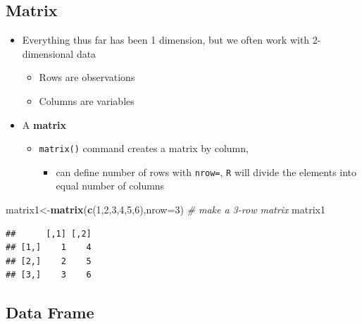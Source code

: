 \documentclass[]{book}
\newenvironment{Shaded}{\begin{snugshade}}{\end{snugshade}}
\newcommand{\KeywordTok}[1]{\textcolor[rgb]{0.13,0.29,0.53}{\textbf{#1}}}
\newcommand{\DataTypeTok}[1]{\textcolor[rgb]{0.13,0.29,0.53}{#1}}
\newcommand{\DecValTok}[1]{\textcolor[rgb]{0.00,0.00,0.81}{#1}}
\newcommand{\CommentTok}[1]{\textcolor[rgb]{0.56,0.35,0.01}{\textit{#1}}}
\newcommand{\NormalTok}[1]{#1}
\providecommand{\tightlist}{%
  \setlength{\itemsep}{0pt}\setlength{\parskip}{0pt}}
\theoremstyle{definition}
\theoremstyle{definition}
\theoremstyle{definition}
\theoremstyle{remark}
\begin{document}
\subsection{Matrix}\label{matrix}

\begin{itemize}
\tightlist
\item
  Everything thus far has been 1 dimension, but we often work with
  2-dimensional data

  \begin{itemize}
  \tightlist
  \item
    Rows are observations
  \item
    Columns are variables
  \end{itemize}
\item
  A \textbf{matrix}

  \begin{itemize}
  \tightlist
  \item
    \texttt{matrix()} command creates a matrix by column,

    \begin{itemize}
    \tightlist
    \item
      can define number of rows with \texttt{nrow=}, \texttt{R} will
      divide the elements into equal number of columns
    \end{itemize}
  \end{itemize}
\end{itemize}

\begin{Shaded}
\begin{Highlighting}[]
\NormalTok{matrix1<-}\KeywordTok{matrix}\NormalTok{(}\KeywordTok{c}\NormalTok{(}\DecValTok{1}\NormalTok{,}\DecValTok{2}\NormalTok{,}\DecValTok{3}\NormalTok{,}\DecValTok{4}\NormalTok{,}\DecValTok{5}\NormalTok{,}\DecValTok{6}\NormalTok{),}\DataTypeTok{nrow=}\DecValTok{3}\NormalTok{) }\CommentTok{# make a 3-row matrix}
\NormalTok{matrix1 }
\end{Highlighting}
\end{Shaded}

\begin{verbatim}
##      [,1] [,2]
## [1,]    1    4
## [2,]    2    5
## [3,]    3    6
\end{verbatim}

\subsection{Data Frame}\label{data-frame}
\end{document}
